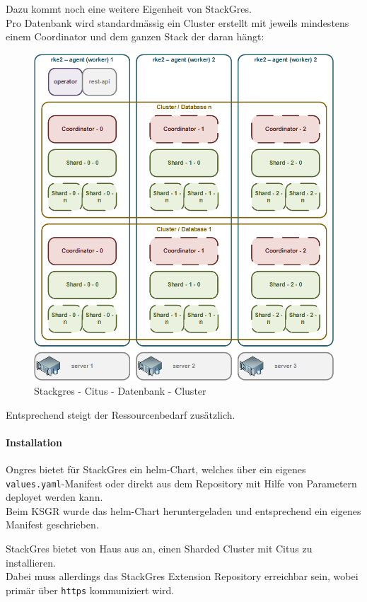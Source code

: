 \begin{flushleft}
    Dazu kommt noch eine weitere Eigenheit von StackGres.\\
    Pro Datenbank wird standardmässig ein Cluster erstellt mit jeweils mindestens einem Coordinator und dem ganzen Stack der daran hängt:
    \begin{figure}[H]
        \centering
        \includegraphics[width=0.8\linewidth]{source/implementation/evaluation/postgresql_ha_solutions/stackgres/stackgres_citus_architecture_clustering}
        \caption{Stackgres - Citus - Datenbank - Cluster}
        \label{fig:stackgres_citus_architecture_clustering}
    \end{figure}
    Entsprechend steigt der Ressourcenbedarf zusätzlich.
\end{flushleft}
\begin{flushleft}
    \paragraph{Installation}
    Ongres bietet für StackGres ein \gls{helm}-Chart, welches über ein eigenes \texttt{values.yaml}-Manifest oder direkt aus dem Repository mit Hilfe von Parametern deployet werden kann.\\
    Beim KSGR wurde das \gls{helm}-Chart heruntergeladen und entsprechend ein eigenes Manifest geschrieben.
\end{flushleft}
\begin{flushleft}
    StackGres bietet von Haus aus an, einen Sharded Cluster mit Citus zu installieren.\\
    Dabei muss allerdings das StackGres Extension Repository erreichbar sein, wobei primär über \texttt{https} kommuniziert wird.
\end{flushleft}

